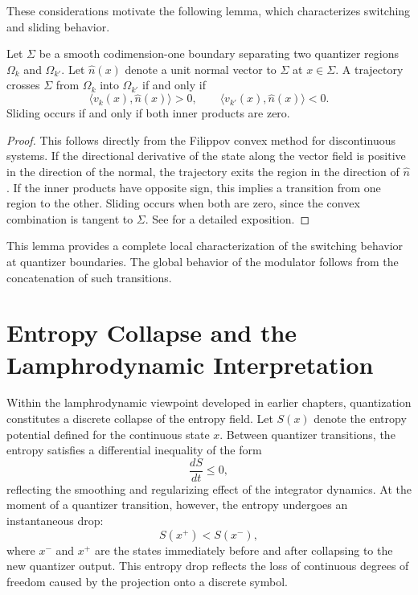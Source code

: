 These considerations motivate the following lemma, which characterizes switching and sliding behavior.

\begin{lemma}
Let $\Sigma$ be a smooth codimension-one boundary separating two quantizer regions $\Omega_k$ and $\Omega_{k'}$. Let $\hat{n}(x)$ denote a unit normal vector to $\Sigma$ at $x \in \Sigma$. A trajectory crosses $\Sigma$ from $\Omega_k$ into $\Omega_{k'}$ if and only if
\[
\langle v_k(x), \hat{n}(x) \rangle > 0,
\qquad
\langle v_{k'}(x), \hat{n}(x) \rangle < 0.
\]
Sliding occurs if and only if both inner products are zero.
\end{lemma}

\begin{proof}
This follows directly from the Filippov convex method for discontinuous systems. If the directional derivative of the state along the vector field is positive in the direction of the normal, the trajectory exits the region in the direction of $\hat{n}$. If the inner products have opposite sign, this implies a transition from one region to the other. Sliding occurs when both are zero, since the convex combination is tangent to $\Sigma$. See \textcite{Khalil2002Nonlinear} for a detailed exposition.
\end{proof}

This lemma provides a complete local characterization of the switching behavior at quantizer boundaries. The global behavior of the modulator follows from the concatenation of such transitions.

\section{Entropy Collapse and the Lamphrodynamic Interpretation}

Within the lamphrodynamic viewpoint developed in earlier chapters, quantization constitutes a discrete collapse of the entropy field. Let $S(x)$ denote the entropy potential defined for the continuous state $x$. Between quantizer transitions, the entropy satisfies a differential inequality of the form
\[
\frac{dS}{dt} \leq 0,
\]
reflecting the smoothing and regularizing effect of the integrator dynamics. At the moment of a quantizer transition, however, the entropy undergoes an instantaneous drop:
\[
S(x^+) < S(x^-),
\]
where $x^-$ and $x^+$ are the states immediately before and after collapsing to the new quantizer output. This entropy drop reflects the loss of continuous degrees of freedom caused by the projection onto a discrete symbol.


